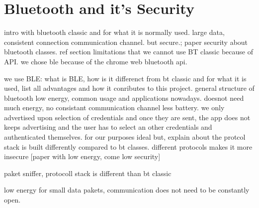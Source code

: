 \section{Bluetooth and it's Security}
\label{bluetooth}

intro with bluetooth classic and for what it is normally used. large data, consistent connection communication channel. but secure.; paper security about bluetooth classes.
ref section limitations that we cannot use BT classic because of API. we chose ble because of the chrome web bluetooth api.

we use BLE: what is BLE, how is it differenct from bt classic and for what it is used, list all advantages and how it conributes to this project. general structure of bluetooth low energy, common usage and applications nowadays.
doesnot need much energy, no consistant communication channel less battery. we only advertised upon selection of credentials and once they are sent, the app does not keeps advertising and the user has to select an other credentials and authenticated themselves.
for our purposes ideal but, explain about the protcol stack is built differently compared to bt classes. different protocols makes it more insecure [paper with low energy, come low security]

paket sniffer, protocoll stack is different than bt classic

low energy for small data pakets, communication does not need to be constantly open.

